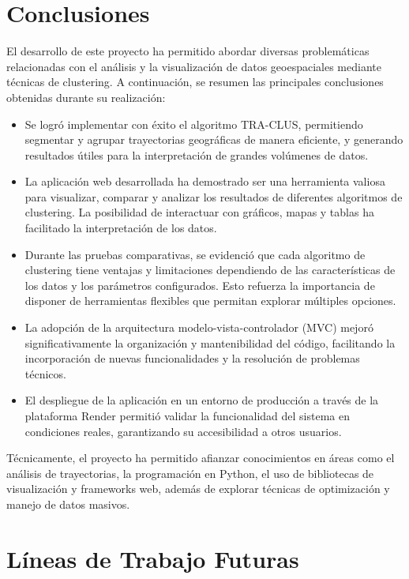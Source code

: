 
\section{Conclusiones}

El desarrollo de este proyecto ha permitido abordar diversas problemáticas relacionadas con el análisis y la visualización de datos geoespaciales mediante técnicas de clustering. A continuación, se resumen las principales conclusiones obtenidas durante su realización:

\begin{itemize}
    \item Se logró implementar con éxito el algoritmo TRA-CLUS, permitiendo segmentar y agrupar trayectorias geográficas de manera eficiente, y generando resultados útiles para la interpretación de grandes volúmenes de datos.
    \item La aplicación web desarrollada ha demostrado ser una herramienta valiosa para visualizar, comparar y analizar los resultados de diferentes algoritmos de clustering. La posibilidad de interactuar con gráficos, mapas y tablas ha facilitado la interpretación de los datos.
    \item Durante las pruebas comparativas, se evidenció que cada algoritmo de clustering tiene ventajas y limitaciones dependiendo de las características de los datos y los parámetros configurados. Esto refuerza la importancia de disponer de herramientas flexibles que permitan explorar múltiples opciones.
    \item La adopción de la arquitectura modelo-vista-controlador (MVC) mejoró significativamente la organización y mantenibilidad del código, facilitando la incorporación de nuevas funcionalidades y la resolución de problemas técnicos.
    \item El despliegue de la aplicación en un entorno de producción a través de la plataforma Render permitió validar la funcionalidad del sistema en condiciones reales, garantizando su accesibilidad a otros usuarios.
\end{itemize}

Técnicamente, el proyecto ha permitido afianzar conocimientos en áreas como el análisis de trayectorias, la programación en Python, el uso de bibliotecas de visualización y frameworks web, además de explorar técnicas de optimización y manejo de datos masivos.

\section{Líneas de Trabajo Futuras}

